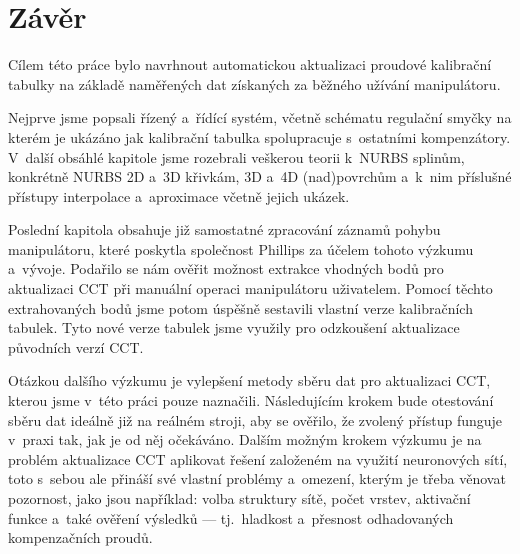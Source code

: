 \section{Závěr}
Cílem této práce bylo navrhnout automatickou aktualizaci proudové kalibrační tabulky na základě naměřených dat získaných za běžného užívání manipulátoru.
\par
Nejprve jsme popsali řízený a~řídící systém, včetně schématu regulační smyčky na kterém je ukázáno jak kalibrační tabulka spolupracuje s~ostatními kompenzátory. V~další obsáhlé kapitole jsme rozebrali veškerou teorii k~NURBS splinům, konkrétně NURBS 2D a~3D křivkám, 3D a~4D (nad)povrchům a~k~nim příslušné přístupy interpolace a~aproximace včetně jejich ukázek.
\par 
Poslední kapitola obsahuje již samostatné zpracování záznamů pohybu manipulátoru, které poskytla společnost Phillips za účelem tohoto výzkumu a~vývoje. Podařilo se nám ověřit možnost extrakce vhodných bodů pro aktualizaci CCT při manuální operaci manipulátoru uživatelem. Pomocí těchto extrahovaných bodů jsme potom úspěšně sestavili vlastní verze kalibračních tabulek. Tyto nové verze tabulek jsme využily pro odzkoušení aktualizace původních verzí CCT.
\par
Otázkou dalšího výzkumu je vylepšení metody sběru dat pro aktualizaci CCT, kterou jsme v~této práci pouze naznačili. Následujícím krokem bude otestování sběru dat ideálně již na reálném stroji, aby se ověřilo, že zvolený přístup funguje v~praxi tak, jak je od něj očekáváno. Dalším možným krokem výzkumu je na problém aktualizace CCT aplikovat řešení založeném na využití neuronových sítí, toto s~sebou ale přináší své vlastní problémy a~omezení, kterým je třeba věnovat pozornost, jako jsou například: volba struktury sítě, počet vrstev, aktivační funkce a~také ověření výsledků --- tj.~hladkost a~přesnost odhadovaných kompenzačních proudů.
